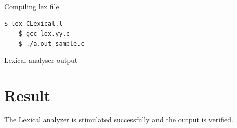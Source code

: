 \vspace{0.5cm}
Compiling lex file
\begin{lstlisting}[style=Terminal]
	$ lex CLexical.l
	$ gcc lex.yy.c
	$ ./a.out sample.c
\end{lstlisting}

\vspace{0.5cm}
Lexical analyser output


\section{Result}
The Lexical analyzer is stimulated successfully and the output is verified.